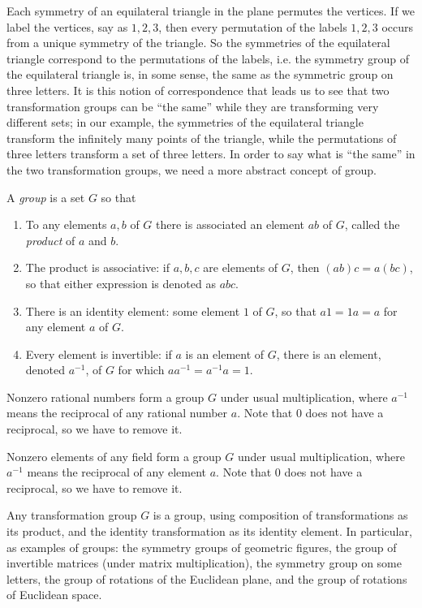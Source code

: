 Each symmetry of an equilateral triangle in the plane permutes the vertices.
If we label the vertices, say as \(1,2,3\), then every permutation of the labels \(1,2,3\) occurs from a unique symmetry of the triangle.
So the symmetries of the equilateral triangle correspond to the permutations of the labels, i.e. the symmetry group of the equilateral triangle is, in some sense, the same as the symmetric group on three letters.
It is this notion of correspondence that leads us to see that two transformation groups can be ``the same'' while they are transforming very different sets; in our example, the symmetries of the equilateral triangle transform the infinitely many points of the triangle, while the permutations of three letters transform a set of three letters.
In order to say what is ``the same'' in the two transformation groups, we need a more abstract concept of group.

A \emph{group} is a set \(G\) so that
\begin{enumerate}
\item 
To any elements \(a,b\) of \(G\) there is associated an element \(ab\) of \(G\), called the \emph{product} of \(a\) and \(b\).
\item
The product is associative: if \(a,b,c\) are elements of \(G\), then \((ab)c=a(bc)\), so that either expression is denoted as \(abc\).
\item
There is an identity element: some element \(1\) of \(G\), so that \(a1=1a=a\) for any element \(a\) of \(G\).
\item
Every element is invertible: if \(a\) is an element of \(G\), there is an element, denoted \(a^{-1}\), of \(G\) for which \(aa^{-1}=a^{-1}a=1\).
\end{enumerate}

\begin{example}
Nonzero rational numbers form a group \(G\) under usual multiplication, where \(a^{-1}\) means the reciprocal of any rational number \(a\).
Note that \(0\) does not have a reciprocal, so we have to remove it.
\end{example}
\begin{example}
Nonzero elements of any field form a group \(G\) under usual multiplication, where \(a^{-1}\) means the reciprocal of any element \(a\).
Note that \(0\) does not have a reciprocal, so we have to remove it.
\end{example}
\begin{example}
Any transformation group \(G\) is a group, using composition of transformations as its product, and the identity transformation as its identity element.
In particular, as examples of groups: the symmetry groups of geometric figures, the group of invertible matrices (under matrix multiplication), the symmetry group on some letters, the group of rotations of the Euclidean plane, and the group of rotations of Euclidean space.
\end{example}

